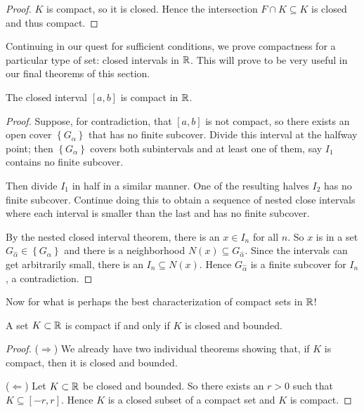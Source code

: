 \documentclass[../m131main.tex]{subfiles}
\begin{document}
\begin{proof}
    $K$ is compact, so it is closed.
    Hence the intersection $F \cap K \subseteq K$ is closed and thus compact.
\end{proof}

Continuing in our quest for sufficient conditions, we prove compactness for a particular type of set: closed intervals in $\mathbb{R}$.
This will prove to be very useful in our final theorems of this section.

\begin{theorem}[]
    The closed interval $[a,b]$ is compact in $\mathbb{R}$.
\end{theorem}

\begin{proof}
    Suppose, for contradiction, that $[a,b]$ is not compact, so there exists an open cover $\left\{ G_\alpha \right\}$ that has no finite subcover.
    Divide this interval at the halfway point; then $\left\{ G_\alpha \right\}$ covers both subintervals and at least one of them, say $I_1$ contains no finite subcover.

    Then divide $I_1$ in half in a similar manner.
    One of the resulting halves $I_2$ has no finite subcover.
    Continue doing this to obtain a sequence of nested close intervals where each interval is smaller than the last and has no finite subcover.

    By the nested closed interval theorem, there is an $x \in I_n$ for all $n$.
    So $x$ is in a set $G_{\hat \alpha} \in \left\{ G_\alpha \right\}$ and there is a neighborhood $N(x) \subseteq G_{\hat \alpha}$.
    Since the intervals can get arbitrarily small, there is an $I_n \subseteq N(x)$.
    Hence $G_{\hat \alpha}$ is a finite subcover for $I_n$, a contradiction.
\end{proof}

Now for what is perhaps the best characterization of compact sets in $\mathbb{R}$!

\begin{theorem}
    A set $K \subset \mathbb{R}$ is compact if and only if $K$ is closed and bounded.
\end{theorem}

\begin{proof}
    ($\Rightarrow$)
    We already have two individual theorems showing that, if $K$ is compact, then it is closed and bounded.
    \smallskip

    ($\Leftarrow$)
    Let $K \subset \mathbb{R}$ be closed and bounded.
    So there exists an $r > 0$ such that $K \subseteq [-r, r]$.
    Hence $K$ is a closed subset of a compact set and $K$ is compact.
\end{proof}
\end{document}
